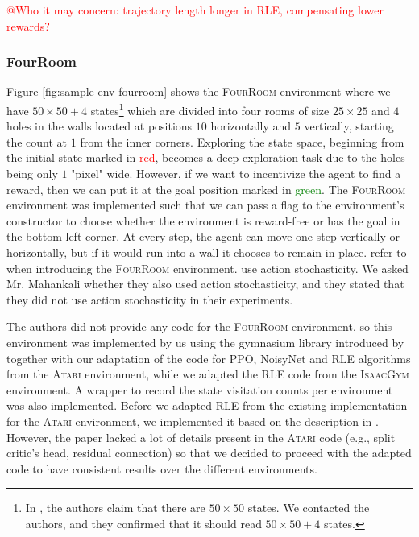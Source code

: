 \documentclass[10pt]{article} %
\begin{document}
\textcolor{red}{@Who it may concern: trajectory length longer in RLE, compensating lower rewards?}

\subsubsection{FourRoom}
Figure \ref{fig:sample-env-fourroom} shows the \textsc{FourRoom} environment where we have $50\times50 + 4$ states\footnote{In \cite{rle-paper}, the authors claim that there are $50\times 50$ states. We contacted the authors, and they confirmed that it should read $50\times 50 + 4$ states.} which are divided into four rooms of size $25\times25$ and $4$ holes in the walls located at positions $10$ horizontally and $5$ vertically, starting the count at $1$ from the inner corners. Exploring the state space, beginning from the initial state marked in \textcolor{red}{red}, becomes a deep exploration task due to the holes being only $1$ "pixel" wide. However, if we want to incentivize the agent to find a reward, then we can put it at the goal position marked in \textcolor{green}{green}. The \textsc{FourRoom} environment was implemented such that we can pass a flag to the environment's constructor to choose whether the environment is reward-free or has the goal in the bottom-left corner. At every step, the agent can move one step vertically or horizontally, but if it would run into a wall it chooses to remain in place. \cite{rle-paper} refer to \cite{grid-world-paper} when introducing the \textsc{FourRoom} environment. \cite{grid-world-paper} use action stochasticity. We asked Mr. Mahankali whether they also used action stochasticity, and they stated that they did not use action stochasticity in their experiments. 

The authors did not provide any code for the \textsc{FourRoom} environment, so this environment was implemented by us using the gymnasium library introduced by \cite{gymnasium-paper} together with our adaptation of the code for PPO, NoisyNet and RLE algorithms from the \textsc{Atari} environment, while we adapted the RLE code from the \textsc{IsaacGym} environment. A wrapper to record the state visitation counts per environment was also implemented. Before we adapted RLE from the existing implementation for the \textsc{Atari} environment, we implemented it based on the description in \cite{rle-paper}. However, the paper lacked a lot of details present in the \textsc{Atari} code (e.g., split critic's head, residual connection) so that we decided to proceed with the adapted code to have consistent results over the different environments. 
\end{document}
